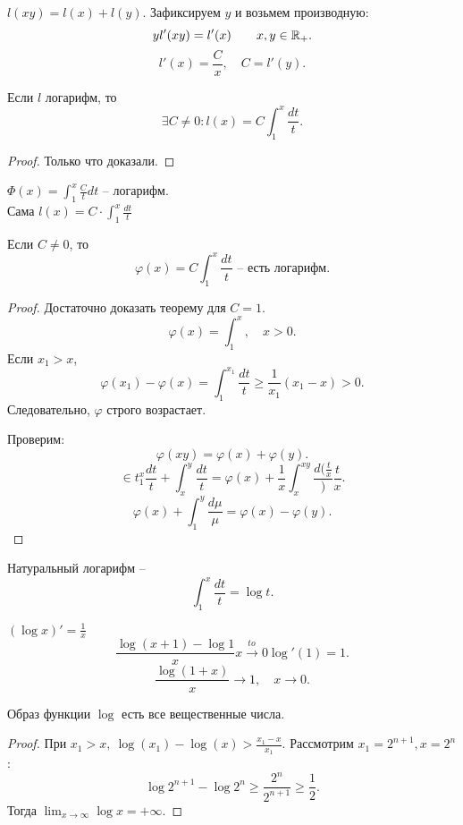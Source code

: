 \documentclass[11pt]{book}
\begin{document}
\begin{thm}$ $

    $ l(xy) = l(x) + l(y)$.
    Зафиксируем $ y$ и возьмем производную:
    \[
	y l'(xy) = l'(x) \qquad x, y \in  \mathbb{R}_{+}
    .\]
    \[
	l'(x) = \frac{C}{x}, \quad C = l'(y)
    .\]
\end{thm}
\begin{thm}
    Если $ l$ логарифм, то \[
	\exists  C \ne 0 : l(x) = C \int_1 ^{x} \frac{dt}{t}
    .\]
\end{thm}
\begin{proof}
    Только что доказали.
\end{proof}
\begin{thm}
    $ \Phi(x) = \int_1^{x} \frac{C}{t}dt$ -- логарифм.\\
    Сама $ l (x) = C \cdot \int_1^{x} \frac{dt}{t}$
\end{thm}
\begin{thm}
    Если $ C \ne 0$, то \[
	\varphi (x) = C\int_1 ^{x} \frac{dt}{t} \text{ -- есть логарифм}
    .\]
\end{thm}
\begin{proof}
    Достаточно доказать теорему для $ C=1$.
    \[
	\varphi (x) = \int_1^{x} ,\quad x>0
    .\]
    Если $ x_1>x$,
    \[
	\varphi (x_1) - \varphi (x) = \int_1^{x_1} \frac{dt}{t} \ge  \frac{1}{x_1} (x_1-x) > 0
    .\]
    Следовательно, $  \varphi $ строго возрастает.

    Проверим:
    \[
	\varphi (xy) = \varphi (x) + \varphi (y)
    .\]
    \[
	\in t_1 ^{x} \frac{dt}{t} +\int_x ^{y} \frac{dt}{t} = \varphi  (x) + \frac{1}{x} \int_x ^{xy} \frac{d(\frac{t}{x}}){\frac{t}{x}}
    .\]
    \[
	\varphi (x) + \int_1 ^{y} \frac{d \mu}{\mu} = \varphi (x) - \varphi (y)
    .\]
\end{proof}
\begin{name}
    Натуральный логарифм --
    \[
	\int_1^{x} \frac{dt}{t} = \log t
    .\]
\end{name}
\begin{prop}
    $ (\log x)' = \frac{1}{x}$
    \[
	\frac{\log (x+1) - \log 1}{x} \stackrel{to} {x \to  0} \log'(1) = 1
    .\]
    \[
	\frac{\log(1+x)}{x} \to 1, \quad x \to  0
    .\]
\end{prop}
\begin{st}
    Образ функции $ \log$ есть все вещественные числа.
\end{st}
\begin{proof}
    При $ x_1>x, ~ \log(x_1) - \log(x) > \frac{x_1-x}{x_1}$.
    Рассмотрим $ x_1 = 2^{n+1}, x = 2^{n}$ :
    \[
	\log 2 ^{n+1} - \log 2^{n} \ge  \frac{2^{n}}{2^{n+1}} \ge \frac{1}{2}
    .\]
    Тогда $ \lim_{x \to  \infty} \log x = + \infty$.
\end{proof}
\end{document}
